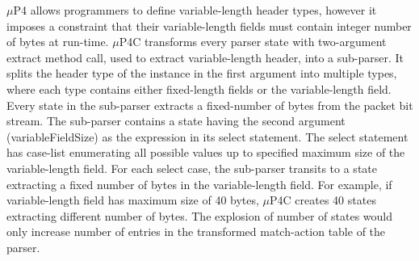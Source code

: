 $\mu$P4 allows programmers to define variable-length header types, however it imposes a constraint that their variable-length fields must contain integer number of bytes at run-time.
$\mu$P4C transforms every parser state with two-argument extract method call, used to extract variable-length header, into a sub-parser.
It splits the header type of the instance in the first argument into multiple types, where each type contains either fixed-length fields or the variable-length field.
Every state in the sub-parser extracts a fixed-number of bytes from the packet bit stream.
The sub-parser contains a state having the second argument (variableFieldSize) as the expression in its select statement.
The select statement has case-list enumerating all possible values up to specified maximum size of the variable-length field.
For each select case, the sub-parser transits to a state extracting a fixed number of bytes in the variable-length field.
For example, if variable-length field has maximum size of 40 bytes, $\mu$P4C creates 40 states extracting different number of bytes.
The explosion of number of states would only increase number of entries in the transformed match-action table of the parser.

% 
% 



